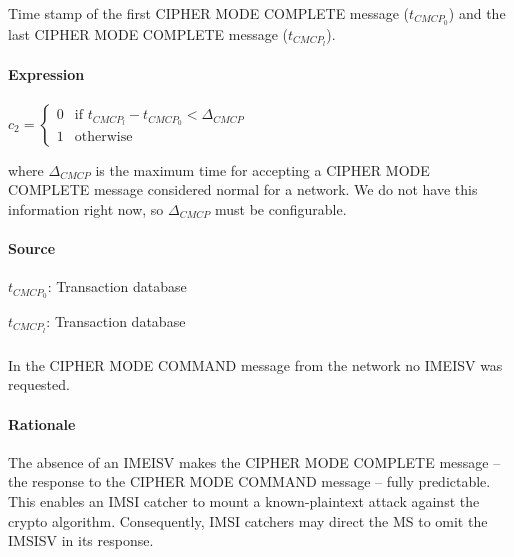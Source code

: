 \documentclass[a4paper,11pt,notitlepage,bigheadings,oneside]{scrartcl}
\begin{document}
Time stamp of the first CIPHER MODE COMPLETE message ($t_{CMCP_0}$) and the
last CIPHER MODE COMPLETE message ($t_{CMCP_l}$).

\paragraph{Expression}

$c_2 =
\begin{cases}
	0 	&  \text{if } t_{CMCP_l} - t_{CMCP_0} < \Delta_{CMCP} \\
	1       &  \text{otherwise}
\end{cases}$

where $\Delta_{CMCP}$ is the maximum time for accepting a CIPHER MODE COMPLETE
message considered normal for a network. We do not have this information right
now, so $\Delta_{CMCP}$ must be configurable.


\paragraph{Source}

$t_{CMCP_0}$: Transaction database


$t_{CMCP_l}$: Transaction database



\subsubsection{}

In the CIPHER MODE COMMAND message from the network no IMEISV was requested.

\paragraph{Rationale}

The absence of an IMEISV makes the CIPHER MODE COMPLETE message -- the response
to the CIPHER MODE COMMAND message -- fully predictable. This enables an IMSI
catcher to mount a known-plaintext attack against the crypto algorithm.
Consequently, IMSI catchers may direct the MS to omit the IMSISV in its
response.
\end{document}
